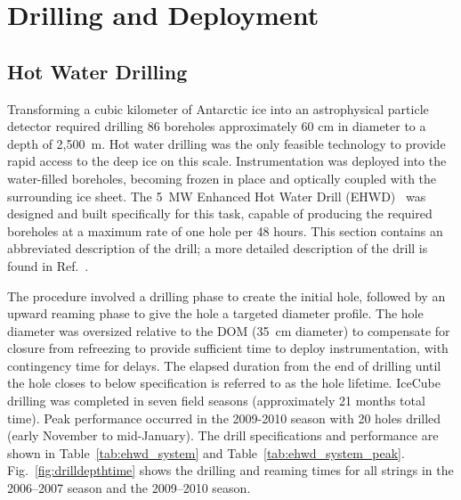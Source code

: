 
\section{\label{sec:drill-deploy}Drilling and Deployment}

\subsection{\label{sec:hot_water_drilling}Hot Water Drilling}

Transforming a cubic kilometer of Antarctic ice into an astrophysical
particle detector required drilling 86 boreholes
approximately 60 cm in diameter to a depth of 2,500~m. Hot water drilling
was the only
feasible technology to provide rapid access to the deep ice on this scale.
Instrumentation was deployed into the water-filled boreholes, becoming
frozen in place and optically
coupled with the surrounding ice sheet. The 5~MW Enhanced Hot Water Drill
(EHWD)~\cite{ehwd} was designed and built specifically for this task,
capable of producing the required boreholes at a maximum rate of one hole per 48
hours. This section contains an abbreviated description of the drill; a more detailed description of the drill
is found in Ref.~\cite{ehwd}.

The procedure involved a drilling phase to create the initial hole,
followed by an upward reaming phase to give the 
hole a targeted diameter profile.  The hole diameter was oversized relative to
the DOM (35~cm diameter) to compensate for closure from refreezing to provide sufficient
time to deploy instrumentation, with contingency time for delays.  The
elapsed duration from the end of drilling until the hole closes to below
specification is referred to as the hole lifetime. IceCube drilling was
completed in seven field seasons (approximately 21 months total time).
Peak performance occurred in the 2009-2010 season with 20 holes drilled
(early November to mid-January).  The drill specifications and performance
are shown in Table~\ref{tab:ehwd_system} and
Table~\ref{tab:ehwd_system_peak}. Fig.~\ref{fig:drilldepthtime} shows the
drilling and reaming times for all strings in the 2006--2007 season and the
2009--2010 season.

\vspace{\baselineskip}

